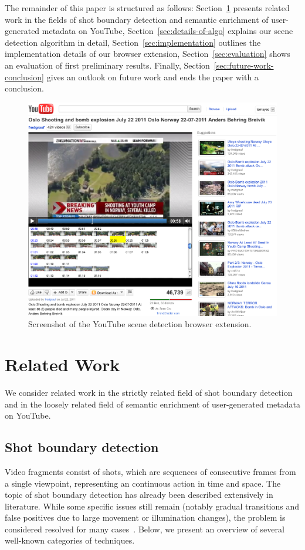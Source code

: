 \documentclass[10pt,twocolumn,letterpaper]{article}
\begin{document}
The remainder of this paper is structured as follows: Section~\ref{sec:related-work} presents related work in the fields of shot boundary detection and semantic enrichment of user-generated metadata on YouTube, Section~\ref{sec:details-of-algo} explains our scene detection algorithm in detail, Section~\ref{sec:implementation} outlines the implementation details of our browser extension, Section~\ref{sec:evaluation} shows an evaluation of first preliminary results. Finally, Section~\ref{sec:future-work-conclusion} gives an outlook on future work and ends the paper with a conclusion.

\begin{figure}
\begin{center}
   \includegraphics[width=0.8\linewidth]{./resources/screenshot.png}
\end{center}
   \caption{Screenshot of the YouTube scene detection browser extension.}
\label{fig:screenshot}
\end{figure}

\section{Related Work} \label{sec:related-work}
We consider related work in the strictly related field of shot boundary detection and in the loosely related field of semantic enrichment of user-generated metadata on YouTube.

\subsection{Shot boundary detection}
Video fragments consist of shots, which are sequences of consecutive frames from a single viewpoint, representing an continuous action in time and space. The topic of shot boundary detection has already been described extensively in literature. While some specific issues still remain (notably gradual transitions and false positives due to large movement or illumination changes), the problem is considered resolved for many cases~\cite{Hanjalic2002, Yuan2007}. Below, we present an overview of several well-known categories of techniques.
\end{document}
